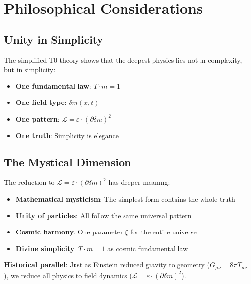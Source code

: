 \documentclass[12pt,a4paper]{article}
\newcommand{\deltam}{\delta m}
\newcommand{\Lag}{\mathcal{L}}
\newcommand{\xipar}{\xi}
\theoremstyle{definition}
\theoremstyle{remark}
\begin{document}
	\section{Philosophical Considerations}
	
	\subsection{Unity in Simplicity}
	
	\begin{tcolorbox}[colback=green!5!white,colframe=green!75!black,title=Philosophical Insight]
		The simplified T0 theory shows that the deepest physics lies not in complexity, but in simplicity:
		
		\begin{itemize}
			\item \textbf{One fundamental law}: $T \cdot m = 1$
			\item \textbf{One field type}: $\deltam(x,t)$
			\item \textbf{One pattern}: $\Lag = \varepsilon \cdot (\partial \deltam)^2$
			\item \textbf{One truth}: Simplicity is elegance
		\end{itemize}
	\end{tcolorbox}
	
	\subsection{The Mystical Dimension}
	
	The reduction to $\Lag = \varepsilon \cdot (\partial \deltam)^2$ has deeper meaning:
	
	\begin{itemize}
		\item \textbf{Mathematical mysticism}: The simplest form contains the whole truth
		\item \textbf{Unity of particles}: All follow the same universal pattern
		\item \textbf{Cosmic harmony}: One parameter $\xipar$ for the entire universe
		\item \textbf{Divine simplicity}: $T \cdot m = 1$ as cosmic fundamental law
	\end{itemize}
	
	\textbf{Historical parallel}: Just as Einstein reduced gravity to geometry ($G_{\mu\nu} = 8\pi T_{\mu\nu}$), we reduce all physics to field dynamics ($\Lag = \varepsilon \cdot (\partial \deltam)^2$).
	
\end{document}
